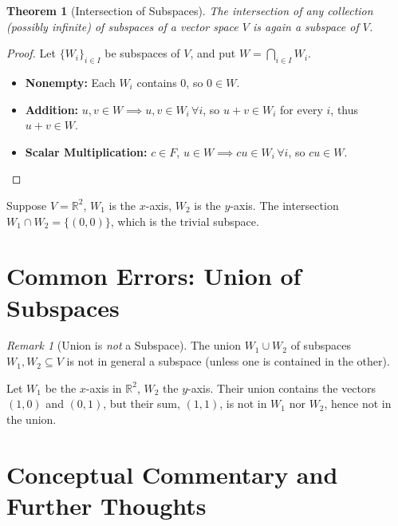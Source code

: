 \documentclass[11pt,a4paper]{article}
\theoremstyle{definition}
\theoremstyle{plain}
\newtheorem{theorem}[definition]{Theorem}
\theoremstyle{remark}
\newtheorem{remark}[definition]{Remark}
\begin{document}
\begin{theorem}[Intersection of Subspaces]
The intersection of any collection (possibly infinite) of subspaces of a vector space $V$ is again a subspace of $V$.
\end{theorem}

\begin{proof}
Let $\{W_i\}_{i\in I}$ be subspaces of $V$, and put $W = \bigcap_{i\in I} W_i$.

\begin{itemize}
    \item \textbf{Nonempty:} Each $W_i$ contains $0$, so $0 \in W$.
    \item \textbf{Addition:} $u, v \in W \implies u, v \in W_i\, \forall i$, so $u+v \in W_i$ for every $i$, thus $u+v \in W$.
    \item \textbf{Scalar Multiplication:} $c \in F$, $u \in W \implies c u \in W_i\, \forall i$, so $cu \in W$.
\end{itemize}
\end{proof}

\begin{additional_example}
Suppose $V = \mathbb{R}^2$, $W_1$ is the $x$-axis, $W_2$ is the $y$-axis. The intersection $W_1 \cap W_2 = \{(0,0)\}$, which is the trivial subspace.
\end{additional_example}

\section{Common Errors: Union of Subspaces}

\begin{remark}[Union is \emph{not} a Subspace]
The union $W_1 \cup W_2$ of subspaces $W_1, W_2 \subseteq V$ is not in general a subspace (unless one is contained in the other).

\begin{additional_example}
Let $W_1$ be the $x$-axis in $\mathbb{R}^2$, $W_2$ the $y$-axis. Their union contains the vectors $(1,0)$ and $(0,1)$, but their sum, $(1,1)$, is not in $W_1$ nor $W_2$, hence not in the union.
\end{additional_example}
\end{remark}

\section{Conceptual Commentary and Further Thoughts}
\end{document}

